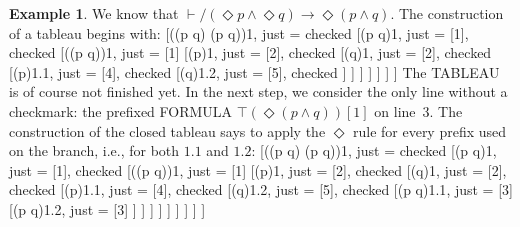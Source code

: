 \documentclass[10pt,a4paper]{article}
\newcommand*{\olup}[1]{\MakeUppercase{#1}}
\theoremstyle{plain}
\theoremstyle{definition}
\newtheorem{ex}[thm]{Example}
\theoremstyle{remark}
\newenvironment{oltableau}{}{}
\providecommand{\lif}{\mathbin{\rightarrow}}
\providecommand{\Proves}{\mathrel{\vdash}}
\providecommand{\sFmla}[2]{#1(#2)}
\providecommand{\pFmla}[2]{#1(#2)}
\providecommand{\True}{\top}
\providecommand{\False}{\bot}
\providecommand{\TAss}[1]{}
\providecommand{\TRule}[1]{}
\begin{document}
{
\begin{ex}
  We know that $\Proves/ (\Diamond p \land \Diamond q) \lif \Diamond(p
  \land q)$. The construction of a tableau begins with:
  \begin{oltableau}
    [\pFmla{\False}{(\Diamond p \land \Diamond q) \lif \Diamond(p \land q)}{1},
      just = \TAss, checked
      [\pFmla{\True}{\Diamond p \land \Diamond q}{1},
        just = {\TRule{\False}{\lif}[1]}, checked
        [\pFmla{\False}{\Diamond(p \land q)}{1},
          just = {\TRule{\False}{\lif}[1]}
          [\pFmla{\True}{\Diamond p}{1},
            just = {\TRule{\True}{\land}[2]}, checked
            [\pFmla{\True}{\Diamond q}{1},
              just = {\TRule{\True}{\land}[2]}, checked
              [\pFmla{\True}{p}{1.1}, 
                just = {\TRule{\True}{\Diamond}[4]}, checked
                [\pFmla{\True}{q}{1.2}, 
                  just = {\TRule{\True}{\Diamond}[5]}, checked
                ]
              ]
            ]
          ]
        ]
      ]
    ]
  \end{oltableau}
  The \olup{tableau} is of course not finished yet. In the next step, we
  consider the only line without a checkmark: the prefixed \olup{formula}
  $\sFmla{\True}{\Diamond(p \land q)}[1]$ on line~$3$. The construction of
  the closed tableau says to apply the $\TRule{\True}{\Diamond}$ rule for
  every prefix used on the branch, i.e., for both $1.1$ and $1.2$:
  \begin{oltableau}
    [\pFmla{\False}{\Diamond(p \land q) \lif (\Diamond p \land \Diamond q)}{1},
      just = \TAss, checked
      [\pFmla{\True}{\Diamond p \land \Diamond q}{1},
        just = {\TRule{\False}{\lif}[1]}, checked
        [\pFmla{\False}{\Diamond (p \land q)}{1},
          just = {\TRule{\False}{\lif}[1]}
          [\pFmla{\True}{\Diamond p}{1},
            just = {\TRule{\True}{\land}[2]}, checked
            [\pFmla{\True}{\Diamond q}{1},
              just = {\TRule{\True}{\land}[2]}, checked
              [\pFmla{\True}{p}{1.1}, 
                just = {\TRule{\True}{\Diamond}[4]}, checked
                [\pFmla{\True}{q}{1.2}, 
                  just = {\TRule{\True}{\Diamond}[5]}, checked
                  [\pFmla{\False}{p \land q}{1.1}, 
                    just = {\TRule{\False}{\Diamond}[3]}
                    [\pFmla{\False}{p \land q}{1.2}, 
                      just = {\TRule{\False}{\Diamond}[3]}
                    ]
                  ]
                ]
              ]
            ]
          ]
        ]
      ]
    ]
  \end{oltableau}

\end{ex}}
\end{document}
